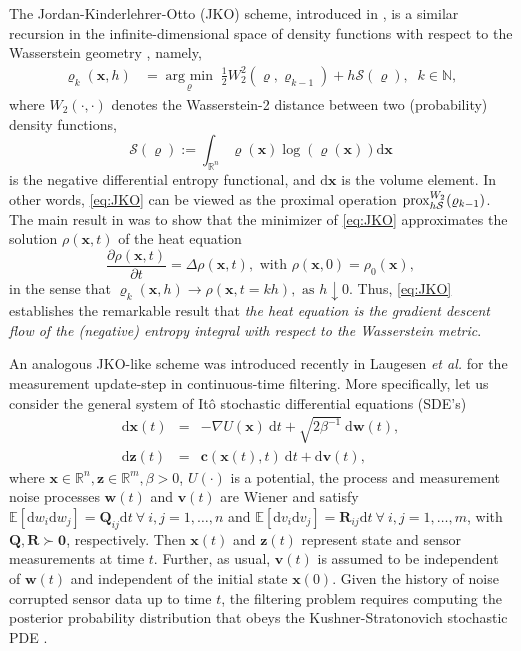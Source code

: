 \documentclass[letterpaper,10pt,twocolumn,conference]{ieeeconf}
\newcommand{\mR}{{\mathbb R}}
\newcommand{\cS}{{\mathcal{S}}}
\newcommand{\bbc}{\bm{c}}
\newcommand{\bbv}{\bm{v}}
\newcommand{\bbw}{\bm{w}}
\newcommand{\bbx}{{\bm{x}}}
\newcommand{\bbz}{\bm{z}}
\newcommand{\bbR}{\bm{R}}
\newcommand{\bbQ}{\bm{Q}}
\newcommand{\argmin}{\operatorname{arg\:min}}
\begin{document}
The Jordan-Kinderlehrer-Otto (JKO) scheme, introduced in \cite{JKO1998}, is a similar recursion in the infinite-dimensional space of density functions with respect to the Wasserstein geometry \cite{VillaniBook2003}, namely,
\begin{align}
\varrho_{k}(\bbx,h)&=\underset{\varrho}{\argmin}\;  \frac12 W_2^2(\varrho,\varrho_{k-1}) + h\cS(\varrho), \;\; k\in\mathbb{N},
\label{eq:JKO}\end{align}
where $W_2(\cdot,\cdot)$ denotes the Wasserstein-2 distance between two (probability) density functions,
\begin{equation}\label{eq:entropy}
\cS(\varrho):=\int_{\mR^n}\varrho(\bbx)\log(\varrho(\bbx))\mathrm{d}\bbx
\end{equation}
is the negative differential entropy functional,
and $\mathrm{d}\bbx$ is the volume element. In other words, \eqref{eq:JKO} can be viewed as the proximal operation ${\rm prox}_{h\cS}^{W_2}(\varrho_{k-1})$.
The main result in \cite{JKO1998} was to show that the minimizer of \eqref{eq:JKO} approximates the solution $\rho(\bbx,t)$ of the heat equation \[
\frac{\partial\rho(\bbx,t)}{\partial t}= \Delta \rho(\bbx,t), \mbox{ with }\rho(\bbx,0)=\rho_0(\bbx),
\]
in the sense that
$
\varrho_{k}(\bbx,h)\to \rho(\bbx,t=kh),\mbox{ as }h\downarrow 0.
$
Thus, \eqref{eq:JKO} establishes the remarkable result that {\em the heat equation is the gradient descent flow of the (negative) entropy integral with respect to the Wasserstein metric}.

An analogous JKO-like scheme was introduced recently in Laugesen \emph{et al.} \cite{LaugesenMehta2015} for the measurement update-step in continuous-time filtering. More specifically, let us consider the general system of It\^{o} stochastic differential equations (SDE's)
\begin{subequations}
\begin{eqnarray}
\mathrm{d}\bm{x}(t) &=& -\nabla U(\bm{x})\:\mathrm{d}t + \sqrt{2\beta^{-1}}\:\mathrm{d}\bm{w}(t),
\label{jkoSDE}\\
\mathrm{d}\bbz(t) &=& \bbc(\bm{x}(t),t)\:\mathrm{d}t + \mathrm{d}\bbv(t), 
\label{ObservationSDE}	
\end{eqnarray}
\end{subequations}
where $\bbx\in\mathbb{R}^{n}, \bbz\in\mathbb{R}^{m}, \beta>0$, $U(\cdot)$ is a potential, the process and measurement noise processes $\bbw(t)$ and $\bbv(t)$ are Wiener and satisfy $\mathbb{E}\left[\mathrm{d}w_{i}\mathrm{d}w_{j}\right] = \bbQ_{ij}\mathrm{d}t \:\forall\:i,j=1,\hdots,n$ and $\mathbb{E}\left[\mathrm{d}v_{i}\mathrm{d}v_{j}\right] = \bbR_{ij}\mathrm{d}t \:\forall\:i,j=1,\hdots,m$, with $\bbQ,\bbR \succ \bm{0}$, respectively. Then $\bbx(t)$ and $\bbz(t)$ represent state and sensor measurements at time $t$. Further, as usual, $\bbv(t)$ is assumed to be independent of  $\bbw(t)$ and independent of the initial state $\bm{x}(0)$.
Given the history of noise corrupted sensor data up to time $t$, the filtering problem requires computing  
the posterior probability distribution that obeys the Kushner-Stratonovich stochastic PDE \cite{Stratonovich1960, Kushner1964,FKK1972}.
\end{document}

